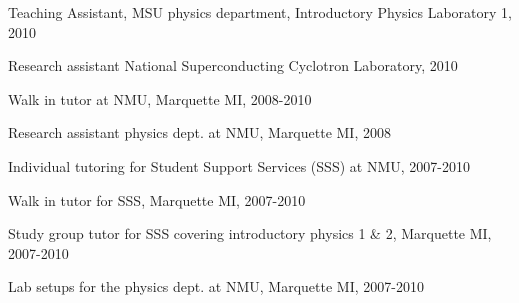 \documentclass{article}
\begin{document}
Teaching Assistant, MSU physics department, Introductory Physics Laboratory 1, 2010

Research assistant National Superconducting Cyclotron Laboratory, 2010

Walk in tutor at NMU, Marquette MI, 2008-2010

Research assistant physics dept. at NMU, Marquette MI, 2008

Individual tutoring for Student Support Services (SSS) at NMU, 2007-2010

Walk in tutor for SSS, Marquette MI, 2007-2010

Study group tutor for SSS covering introductory physics 1 \& 2, Marquette MI, 2007-2010

Lab setups for the physics dept. at NMU, Marquette MI, 2007-2010
\end{document}
